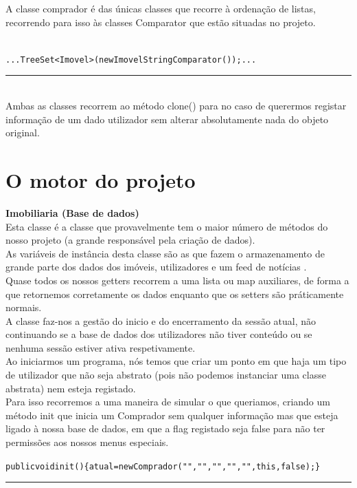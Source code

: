 \documentclass[12pt]{article}
\newenvironment{code}                    
{\textbf{
} \hspace{1cm} \hrulefill \\ 
\smallskip 
\begin{center}
\begin{minipage}{0.9\textwidth} 
\begin{alltt}\small}
{\end{alltt}
\end{minipage}
\end{center}
\hrule\smallskip
}
\begin{document}
A classe comprador é das únicas classes que recorre à ordenação de listas, recorrendo para isso às classes Comparator que estão situadas no projeto.
~\\
\newline
\begin{code}
... TreeSet <Imovel> (new ImovelStringComparator ()); ...
\end{code}
~\\

Ambas as classes recorrem ao método clone() para no caso de querermos registar informação de um dado utilizador sem alterar absolutamente nada do objeto original.


\pagebreak

\section{O motor do projeto}

\textbf{Imobiliaria (Base de dados)}
\\

Esta classe é a classe que provavelmente tem o maior número de métodos do nosso projeto (a grande responsável pela criação de dados).
\\

As variáveis de instância desta classe são as que fazem o armazenamento de grande parte dos dados dos imóveis, utilizadores e um feed de notícias . 
\\

Quase todos os nossos getters recorrem a uma lista ou map auxiliares, de forma a que retornemos corretamente os dados enquanto que os setters são práticamente normais.
\\

A classe faz-nos a gestão do inicio e do encerramento da sessão atual, não continuando se a base de dados dos utilizadores não tiver conteúdo ou se nenhuma sessão estiver ativa respetivamente.
\\

Ao iniciarmos um programa, nós temos que criar um ponto em que haja um tipo de utilizador que não seja abstrato (pois não podemos instanciar uma classe abstrata) nem esteja registado.\\

Para isso recorremos a uma maneira de simular o que queriamos, criando um método init que inicia um Comprador sem qualquer informação mas que esteja ligado à nossa base de dados, em que a flag registado seja false para não ter permissões aos nossos menus especiais.
\newline
\begin{code}
   public void init()\{atual = new Comprador ("","","","","",this,false);\}
\end{code}
~\\
\end{document}
